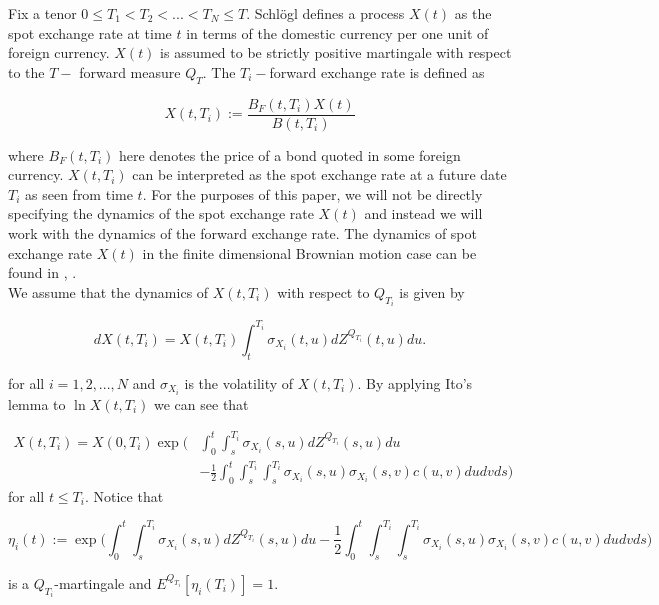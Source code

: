 \documentclass[11pt]{article}
\begin{document}
Fix a tenor $0\leq T_1<T_2<...<T_N\leq T$. Schl\"ogl \cite{schlogl} defines a process $X(t)$ as the spot exchange rate at time $t$ in terms of the domestic currency per one unit of foreign currency. $X(t)$ is assumed to be strictly positive martingale with respect to the $T-$ forward measure $Q_T$.  The $T_i-$forward exchange rate is defined as

\begin{equation}
    X(t,T_i):=\frac{B_F(t,T_i) X(t)}{B(t,T_i)}
\end{equation}

where $B_F(t,T_i)$ here denotes the price of a bond quoted in some foreign currency. $X(t,T_i)$ can be interpreted as the spot exchange rate at a future date $T_i$ as seen from time $t$. For the purposes of this paper, we will not be directly specifying the dynamics of the spot exchange rate $X(t)$ and instead we will work with the dynamics of the forward exchange rate. The dynamics of spot exchange rate $X(t)$ in the finite dimensional Brownian motion case can be found in \cite{musiela}, \cite{brace2007engineering}.\\

We assume that the dynamics of $X(t,T_i)$ with respect to $Q_{T_i}$ is given by

\begin{equation}
    dX(t,T_i)=X(t,T_i)\int_t^{T_i}\sigma_{X_{i}}(t,u)dZ^{Q_{T_i}}(t,u)du. 
\end{equation}

for all $i=1,2,...,N$ and $\sigma_{X_i}$ is the volatility of $X(t,T_i)$. By  applying Ito's lemma to $\ln X(t,T_i)$ we can see that

\begin{equation}
\begin{split}
     X(t,T_i)=X(0,T_i)\exp\Bigg(&\int_0^t\int_s^{T_i}\sigma_{X_{i}}(s,u)dZ^{Q_{T_i}}(s,u)du\\&-\frac{1}{2}\int_0^t\int_s^{T_i}\int_s^{T_i}\sigma_{X_{i}}(s,u)\sigma_{X_{i}}(s,v)c(u,v)dudvds\Bigg)   
\end{split}
\end{equation}
for all $t\leq T_i.$ Notice that 

\begin{equation*}
    \eta_i(t):= \exp\Bigg(\int_0^t\int_s^{T_i}\sigma_{X_{i}}(s,u)dZ^{Q_{T_i}}(s,u)du-\frac{1}{2}\int_0^t\int_s^{T_i}\int_s^{T_i}\sigma_{X_{i}}(s,u)\sigma_{X_{i}}(s,v)c(u,v)dudvds\Bigg) 
\end{equation*}

is a $Q_{T_{i}}$-martingale and $E^{Q_{T_{i}}}[\eta_i(T_i)]=1.$
\end{document}
